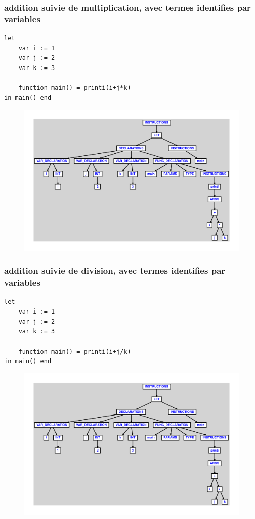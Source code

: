 \documentclass{article}
\begin{document}
\subsubsection{addition suivie de multiplication, avec termes identifies par variables}
\begin{lstlisting}
let
	var i := 1
	var j := 2
	var k := 3

	function main() = printi(i+j*k)
in main() end
\end{lstlisting}
\newpage
\begin{figure}[H]
\centering
\includegraphics[max width=\textwidth]{ast/ast_57.pdf}
\end{figure}
\newpage
\subsubsection{addition suivie de division, avec termes identifies par variables}
\begin{lstlisting}
let
	var i := 1
	var j := 2
	var k := 3

	function main() = printi(i+j/k)
in main() end
\end{lstlisting}
\newpage
\begin{figure}[H]
\centering
\includegraphics[max width=\textwidth]{ast/ast_58.pdf}
\end{figure}
\newpage
\end{document}

